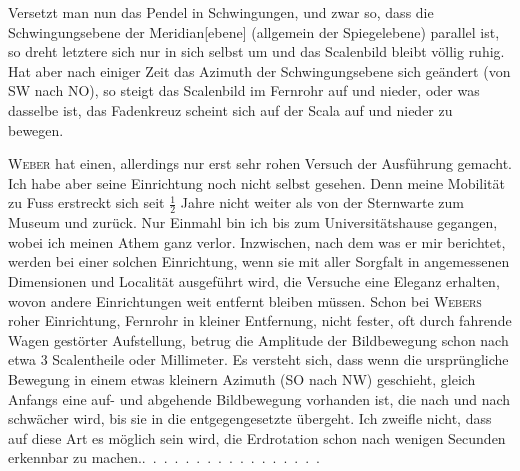 Versetzt man nun das Pendel in Schwingungen, und zwar so, dass die
Schwingungsebene der Meridian[ebene] (allgemein der Spiegelebene) parallel
ist, so dreht letztere sich nur in sich selbst um und das Scalenbild bleibt völlig
ruhig. Hat aber nach einiger Zeit das Azimuth der Schwingungsebene sich
geändert (von SW nach NO), so steigt das Scalenbild im Fernrohr auf und
nieder, oder was dasselbe ist, das Fadenkreuz scheint sich auf der Scala auf
und nieder zu bewegen.

\textsc{Weber} hat einen, allerdings nur erst sehr rohen Versuch der Ausführung
gemacht. Ich habe aber seine Einrichtung noch nicht selbst gesehen. Denn
meine Mobilität zu Fuss erstreckt sich seit \(\tfrac{1}{2}\) Jahre nicht weiter als von der
\clearpage{}
\noindent Sternwarte zum Museum und zurück. Nur Einmahl bin ich bis zum Universitätshause
gegangen, wobei ich meinen Athem ganz verlor. Inzwischen, nach dem
was er mir berichtet, werden bei einer solchen Einrichtung, wenn sie mit
aller Sorgfalt in angemessenen Dimensionen und Localität ausgeführt wird,
die Versuche eine Eleganz erhalten, wovon andere Einrichtungen weit entfernt
bleiben müssen. Schon bei \textsc{Webers} roher Einrichtung, Fernrohr in kleiner
Entfernung, nicht fester, oft durch fahrende Wagen gestörter Aufstellung, betrug
die Amplitude der Bildbewegung schon nach  etwa
3 Scalentheile oder Millimeter. Es versteht sich, dass wenn die ursprüngliche
Bewegung in einem etwas kleinern Azimuth (SO nach NW) geschieht,
gleich Anfangs eine auf- und abgehende Bildbewegung vorhanden ist, die nach
und nach schwächer wird, bis sie in die entgegengesetzte übergeht. Ich
zweifle nicht, dass auf diese Art es möglich sein wird, die Erdrotation schon
nach wenigen Secunden erkennbar zu machen.\quad .\ .\ .\ .\ .\ .\ .\ .\ .\ .\ .\ .\ .\ .\ .\ .\ .
\clearpage\endgroup
